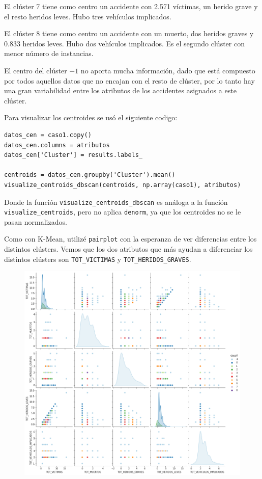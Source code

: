 \documentclass[a4]{article}
\begin{document}
El clúster 7 tiene como centro un accidente con 2.571 víctimas, un herido grave y el resto heridos leves. Hubo tres vehículos implicados.

El clúster 8 tiene como centro un accidente con un muerto, dos heridos graves y 0.833 heridos leves. Hubo dos vehículos implicados. Es el segundo clúster con menor número de instancias.

El centro del clúster $-1$ no aporta mucha información, dado que está compuesto por todos aquellos datos que no encajan con el resto de clúster, por lo tanto hay una gran variabilidad entre los atributos de los accidentes asignados a este clúster.

Para visualizar los centroides se usó el siguiente codigo:

\begin{lstlisting}
datos_cen = caso1.copy()
datos_cen.columns = atributos
datos_cen['Cluster'] = results.labels_

centroids = datos_cen.groupby('Cluster').mean()
visualize_centroids_dbscan(centroids, np.array(caso1), atributos)
\end{lstlisting}

Donde la función \texttt{visualize\_centroids\_dbscan} es análoga a la función \texttt{visualize\_centroids}, pero no aplica \texttt{denorm}, ya que los centroides no se le pasan normalizados.

Como con K-Mean, utilizé \texttt{pairplot} con la esperanza de ver diferencias entre los distintos clústers. Vemos que los dos atributos que más ayudan a diferenciar los distintos clústers son \texttt{TOT\_VICTIMAS} y \texttt{TOT\_HERIDOS\_GRAVES}.

\begin{figure}[H]
  \centering
  \includegraphics[width=160mm]{imagenes/c1_dbscan_pairplot}
\end{figure}
\end{document}

